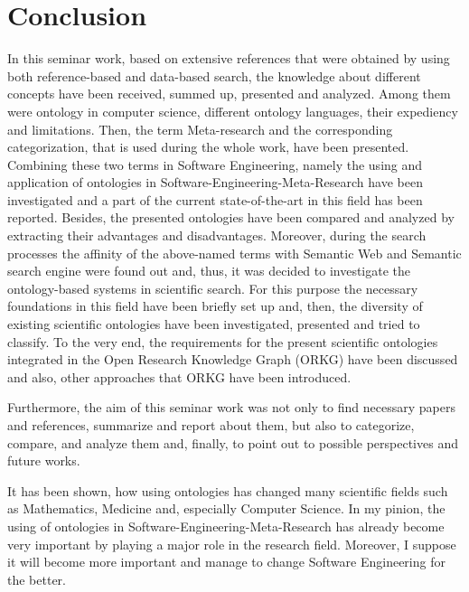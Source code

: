 
\section{Conclusion}
\label{ch:Conclusion}

In this seminar work, based on extensive references that were obtained by using both reference-based and data-based search, the knowledge about different concepts have been received, summed up, presented and analyzed. Among them were ontology in computer science, different ontology languages, their expediency and limitations. Then, the term Meta-research and the corresponding categorization, that is used during the whole work, have been presented. Combining these two terms in Software Engineering, namely the using and application of ontologies in Software-Engineering-Meta-Research have been investigated and a part of the current state-of-the-art in this field has been reported. Besides, the presented ontologies have been compared and analyzed by extracting their advantages and disadvantages. Moreover, during the search processes the affinity of the above-named terms with Semantic Web and Semantic search engine were found out and, thus, it was decided to investigate the ontology-based systems in scientific search. For this purpose the necessary foundations in this field have been briefly set up and, then, the diversity of existing scientific ontologies have been investigated, presented and tried to classify. To the very end, the requirements for the present scientific ontologies integrated in the Open Research Knowledge Graph (ORKG) have been discussed and also, other approaches that ORKG have been introduced.

Furthermore, the aim of this seminar work was not only to find necessary papers and references, summarize and report about them, but also to categorize, compare, and analyze them and, finally, to point out to possible perspectives and future works. 

It has been shown, how using ontologies has changed many scientific fields such as Mathematics, Medicine and, especially Computer Science. In my pinion, the using of  ontologies in Software-Engineering-Meta-Research has already become very important by playing a major role in the research field. Moreover, I suppose it will become more important and manage to change Software Engineering for the better.       